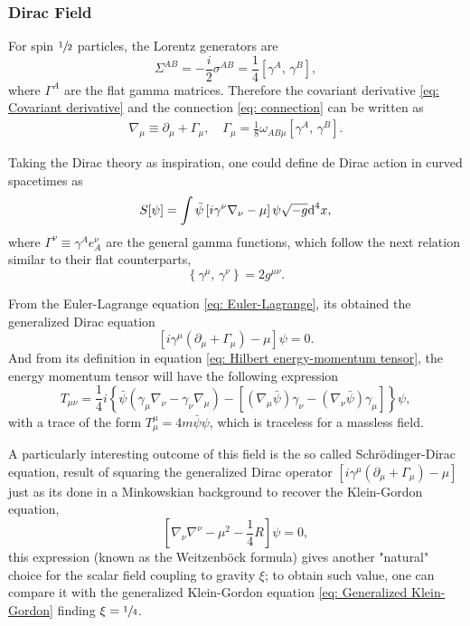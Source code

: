 \subsubsection{Dirac Field}
For spin $\sfrac{1}{2}$ particles, the Lorentz generators are
\begin{equation}
	\Sigma^{AB}=-\frac{i}{2}\sigma^{AB}=\frac{1}{4}\left[\gamma^A,\,\gamma^B\right],
\end{equation}
where $\Gamma^A$ are the flat gamma matrices. Therefore the covariant derivative \ref{eq: Covariant derivative} and the connection \ref{eq: connection} can be written as
\begin{subequations}
	\begin{gather}
		\nabla_\mu\equiv\partial_\mu+\Gamma_\mu,\quad \Gamma_\mu=\frac{1}{8}\omega_{AB\mu}\left[\gamma^A,\,\gamma^B\right].
	\end{gather}
\end{subequations}

Taking the Dirac theory as inspiration, one could define de Dirac action in curved spacetimes as
\begin{equation}
	S[\psi]=\int \bar{\psi}\left[i\gamma^\nu\nabla_\nu-\mu\right]\psi\sqrt{-g}\text{d}^4x,
\end{equation}
where $\Gamma^\nu\equiv \gamma^Ae^\nu_A$ are the general gamma functions, which follow the next relation similar to their flat counterparts,
\begin{equation}
	\left\{\gamma^\mu,\,\gamma^\nu\right\}=2g^{\mu\nu}.
\end{equation}

From the Euler-Lagrange equation \ref{eq: Euler-Lagrange}, its obtained the generalized Dirac equation
\begin{equation}
	\left[i\gamma^\mu\left(\partial_\mu+\Gamma_\mu\right)-\mu\right]\psi=0.
\end{equation}
And from its definition in equation \ref{eq: Hilbert energy-momentum tensor}, the energy momentum tensor will have \cite[sec.\,3.8]{BirrelDavies} the following expression
\begin{equation}
	T_{\mu\nu}=\frac{1}{4}i\left\{\bar{\psi}\left(\gamma_\mu\nabla_\nu-\gamma_\nu\nabla_\mu\right)-\left[\left(\nabla_\mu\bar{\psi}\right)\gamma_\nu-\left(\nabla_\nu\bar{\psi}\right)\gamma_\mu\right]\right\}\psi,
\end{equation}
with a trace of the form $T^\mu_\mu=4m\bar{\psi}\psi$, which is traceless for a massless field.

A particularly interesting outcome of this field is the so called Schrödinger-Dirac equation, result of squaring the generalized Dirac operator $\left[i\gamma^\mu\left(\partial_\mu+\Gamma_\mu\right)-\mu\right]$ just as its done in a Minkowskian background to recover the Klein-Gordon equation,
\begin{equation}
	\left[\nabla_\nu\nabla^\nu-\mu^2-\frac{1}{4}R\right]\psi=0,
\end{equation}
this expression (known as the Weitzenböck formula) gives another "natural" choice for the scalar field coupling to gravity $\xi$; to obtain such value, one can compare it with the generalized Klein-Gordon equation \ref{eq: Generalized Klein-Gordon} finding $\xi=\sfrac{1}{4}$.

